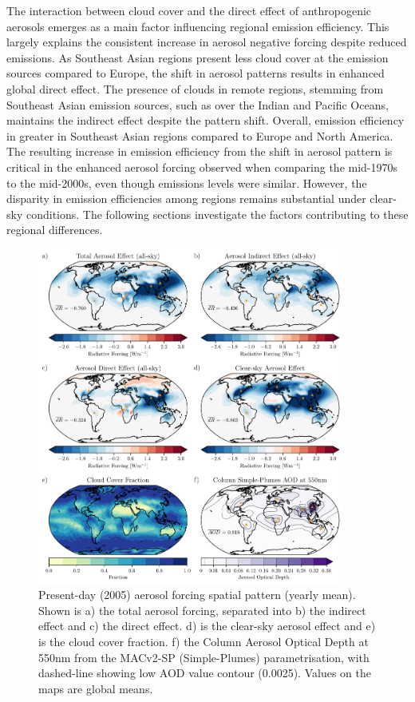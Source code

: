 \documentclass[draft]{agujournal2019}
\begin{document}
            The interaction between cloud cover and the direct effect of anthropogenic aerosols emerges as a main factor influencing regional emission efficiency. This largely explains the consistent increase in aerosol negative forcing despite reduced emissions. As Southeast Asian regions present less cloud cover at the emission sources compared to Europe, the shift in aerosol patterns results in enhanced global direct effect. The presence of clouds in remote regions, stemming from Southeast Asian emission sources, such as over the Indian and Pacific Oceans, maintains the indirect effect despite the pattern shift. Overall, emission efficiency in greater in Southeast Asian regions compared to Europe and North America.
            The resulting increase in emission efficiency from the shift in aerosol pattern is critical in the enhanced aerosol forcing observed when comparing the mid-1970s to the mid-2000s, even though emissions levels were similar.
            However, the disparity in emission efficiencies among regions remains substantial under clear-sky conditions. The following sections investigate the factors contributing to these regional differences.
            
      \begin{figure}
            \centering
            \includegraphics[width=0.9\textwidth]{../../figures/figure3}
            \caption{Present-day (2005) aerosol forcing spatial pattern (yearly mean). Shown is a) the total aerosol forcing, separated into b) the indirect effect and c) the direct effect. d) is the clear-sky aerosol effect and e) is the cloud cover fraction. f) the Column Aerosol Optical Depth at 550nm from the MACv2-SP (Simple-Plumes) parametrisation, with dashed-line showing low AOD value contour (0.0025). Values on the maps are global means.}
            \label{fig:figure3}
      \end{figure}
\end{document}
